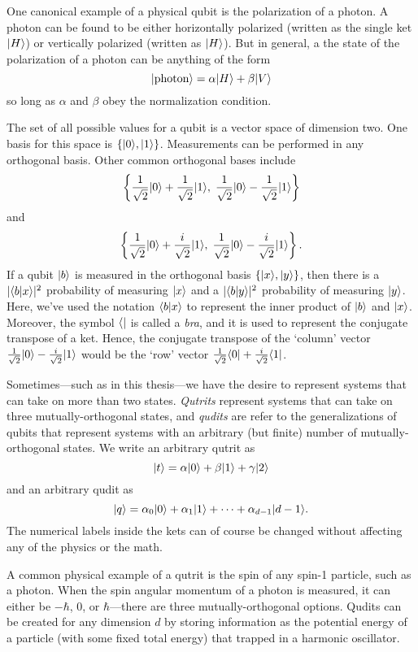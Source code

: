 One canonical example of a physical qubit is the polarization of a photon. A photon can be found to be either horizontally polarized (written as the single ket $| H \rangle$) or vertically polarized (written as $| H \rangle$). But in general, a the state of the polarization of a photon can be anything of the form
\[
| \text{photon} \rangle = \alpha | H \rangle + \beta | V \rangle
\] so long as $\alpha$ and $\beta$ obey the normalization condition.


The set of all possible values for a qubit is a vector space of dimension two. One basis for this space is $\{| 0 \rangle, | 1 \rangle\}$. Measurements can be performed in any orthogonal basis. Other common orthogonal bases include
\[
\left\{\frac{1}{\sqrt{2}}| 0 \rangle + \frac{1}{\sqrt{2}}| 1 \rangle, \; \frac{1}{\sqrt{2}}| 0 \rangle -\frac{1}{\sqrt{2}} | 1 \rangle\right\}
\] and
\[
\left\{\frac{1}{\sqrt{2}}| 0 \rangle + \frac{i}{\sqrt{2}}| 1 \rangle, \; \frac{1}{\sqrt{2}}| 0 \rangle -\frac{i}{\sqrt{2}} | 1 \rangle\right\}.
\] If a qubit $| b \rangle$ is measured in the orthogonal basis $\{| x \rangle, | y \rangle\}$, then there is a $|\langle b | x \rangle|^2$ probability of measuring $| x \rangle$ and a $|\langle b | y \rangle|^2$ probability of measuring $| y \rangle$.   Here, we've used the notation $\langle b | x \rangle$ to represent the inner product of $| b \rangle$ and $| x \rangle$. Moreover, the symbol $\langle  |$ is called a \textit{bra}, and it is used to represent the conjugate transpose of a ket.  Hence, the conjugate transpose of the `column' vector $\frac{1}{\sqrt{2}}| 0 \rangle -\frac{i}{\sqrt{2}} | 1 \rangle$ would be the `row' vector $\frac{1}{\sqrt{2}}\langle 0 | + \frac{i}{\sqrt{2}} \langle 1 |$. 



Sometimes---such as in this thesis---we have the desire to represent systems that can take on more than two states. \textit{Qutrits} represent systems that can take on three mutually-orthogonal states, and \textit{qudits} are refer to the generalizations of qubits that represent systems with an arbitrary (but finite) number of mutually-orthogonal states. We write an arbitrary qutrit as 
\[
| t \rangle = \alpha | 0 \rangle + \beta | 1 \rangle + \gamma | 2 \rangle
\]
and an arbitrary qudit as
\[
| q \rangle = \alpha_0 | 0 \rangle + \alpha_1 | 1 \rangle + \cdots + \alpha_{d-1} | d-1 \rangle.
\] The numerical labels inside the kets can of course be changed without affecting any of the physics or the math.

A common physical example of a qutrit is the spin of any spin-1 particle, such as a photon. When the spin angular momentum of a photon is measured, it can either be $-\hbar$, $0$, or $\hbar$---there are three mutually-orthogonal options. Qudits can be created for any dimension $d$ by storing information as the potential energy of a particle (with some fixed total energy) that trapped in a harmonic oscillator.

